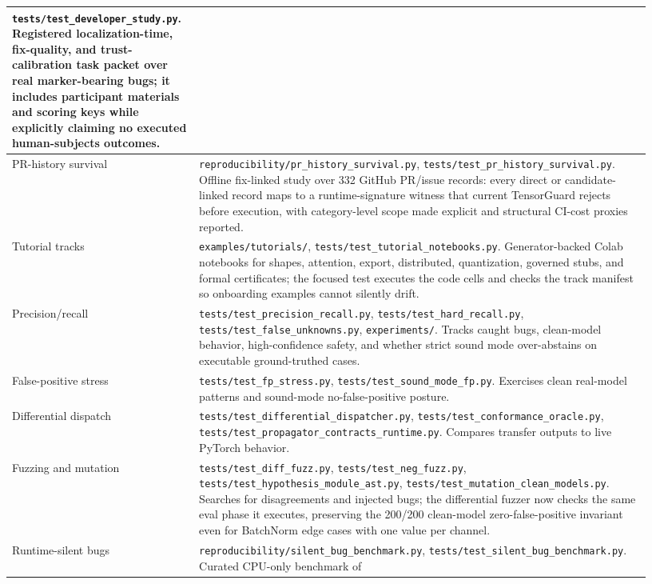 \documentclass[11pt]{article}
\newcommand{\tg}{TensorGuard}
\begin{document}
\begin{longtable}{|p{0.25\linewidth}|p{0.68\linewidth}|}
\texttt{tests/test\_developer\_study.py}.  Registered localization-time,
fix-quality, and trust-calibration task packet over real marker-bearing bugs;
it includes participant materials and scoring keys while explicitly claiming no
executed human-subjects outcomes. \\
\hline
PR-history survival &
\texttt{reproducibility/pr\_history\_survival.py},
\texttt{tests/test\_pr\_history\_survival.py}.  Offline fix-linked study over
332 GitHub PR/issue records: every direct or candidate-linked record maps to a
runtime-signature witness that current \tg{} rejects before execution, with
category-level scope made explicit and structural CI-cost proxies reported. \\
\hline
Tutorial tracks &
\texttt{examples/tutorials/},
\texttt{tests/test\_tutorial\_notebooks.py}.  Generator-backed Colab notebooks
for shapes, attention, export, distributed, quantization, governed stubs, and
formal certificates; the focused test executes the code cells and checks the
track manifest so onboarding examples cannot silently drift. \\
\hline
Precision/recall &
\texttt{tests/test\_precision\_recall.py},
\texttt{tests/test\_hard\_recall.py},
\texttt{tests/test\_false\_unknowns.py}, \texttt{experiments/}.  Tracks caught
bugs, clean-model behavior, high-confidence safety, and whether strict sound
mode over-abstains on executable ground-truthed cases. \\
\hline
False-positive stress &
\texttt{tests/test\_fp\_stress.py}, \texttt{tests/test\_sound\_mode\_fp.py}.
Exercises clean real-model patterns and sound-mode no-false-positive posture. \\
\hline
Differential dispatch &
\texttt{tests/test\_differential\_dispatcher.py},
\texttt{tests/test\_conformance\_oracle.py},
\texttt{tests/test\_propagator\_contracts\_runtime.py}.  Compares transfer
outputs to live PyTorch behavior. \\
\hline
Fuzzing and mutation &
\texttt{tests/test\_diff\_fuzz.py}, \texttt{tests/test\_neg\_fuzz.py},
\texttt{tests/test\_hypothesis\_module\_ast.py},
\texttt{tests/test\_mutation\_clean\_models.py}.  Searches for disagreements
and injected bugs; the differential fuzzer now checks the same eval phase it
executes, preserving the 200/200 clean-model zero-false-positive invariant even
for BatchNorm edge cases with one value per channel. \\
\hline
Runtime-silent bugs &
\texttt{reproducibility/silent\_bug\_benchmark.py},
\texttt{tests/test\_silent\_bug\_benchmark.py}.  Curated CPU-only benchmark of

\end{longtable}
\end{document}
